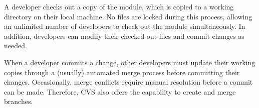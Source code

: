 A developer checks out a copy of the module, which is copied to a working directory on their local machine. No files are locked during this process, allowing an unlimited number of developers to check out the module simultaneously. In addition, developers can modify their checked-out files and commit changes as needed.
\smallskip

When a developer commits a change, other developers must update their working copies through a (usually) automated merge process before committing their changes. Occasionally, merge conflicts require manual resolution before a commit can be made. Therefore, CVS also offers the capability to create and merge branches.



